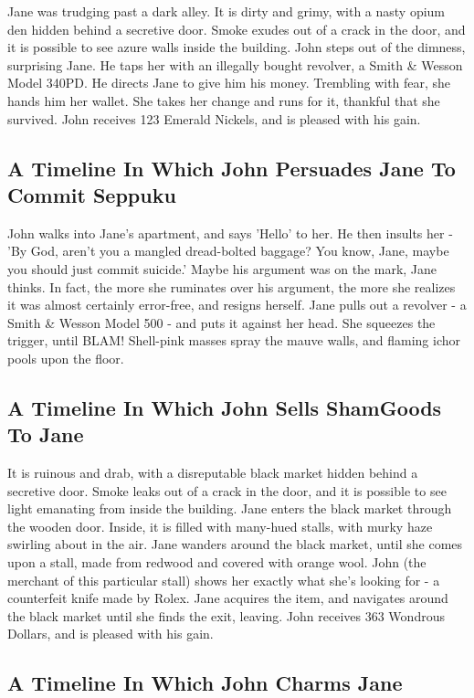 \documentclass{article}
\begin{document}
Jane was trudging past a dark alley.
It is dirty and grimy, with a nasty opium den hidden behind a secretive door.
Smoke exudes out of a crack in the door, and it is possible to see azure walls inside the building.
John steps out of the dimness, surprising Jane.
He taps her with an illegally bought revolver, a Smith \& Wesson Model 340PD.
He directs Jane to give him his money.
Trembling with fear, she hands him her wallet.
She takes her change and runs for it, thankful that she survived.
John receives 123 Emerald Nickels, and is pleased with his gain.
\subsection{A Timeline In Which John Persuades Jane To Commit Seppuku}


John walks into Jane's apartment, and says 'Hello' to her.
He then insults her {-} 'By God, aren't you a mangled dread{-}bolted baggage?
You know, Jane, maybe you should just commit suicide.'
Maybe his argument was on the mark, Jane thinks.
In fact, the more she ruminates over his argument, the more she realizes it was almost certainly error{-}free, and resigns herself.
Jane pulls out a revolver {-} a Smith \& Wesson Model 500 {-} and puts it against her head.
She squeezes the trigger, until BLAM!
Shell{-}pink masses spray the mauve walls, and flaming ichor pools upon the floor.
\subsection{A Timeline In Which John Sells ShamGoods To Jane}


It is ruinous and drab, with a disreputable black market hidden behind a secretive door.
Smoke leaks out of a crack in the door, and it is possible to see light emanating from inside the building.
Jane enters the black market through the wooden door.
Inside, it is filled with many{-}hued stalls, with murky haze swirling about in the air.
Jane wanders around the black market, until she comes upon a stall, made from redwood and covered with orange wool.
John (the merchant of this particular stall) shows her exactly what she's looking for {-} a counterfeit knife made by Rolex.
Jane acquires the item, and navigates around the black market until she finds the exit, leaving.
John receives 363 Wondrous Dollars, and is pleased with his gain.
\subsection{A Timeline In Which John Charms Jane}
\end{document}
